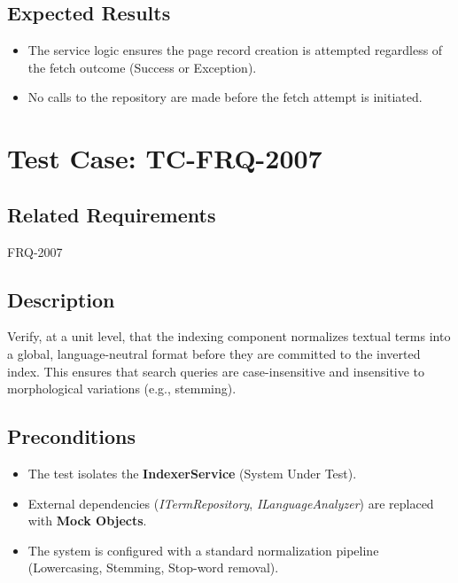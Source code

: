 \documentclass{article}
\begin{document}
\subsection*{Expected Results}
\begin{itemize}
    \item The service logic ensures the page record creation is attempted regardless of the fetch outcome (Success or Exception).
    \item No calls to the repository are made before the fetch attempt is initiated.
\end{itemize}



\section{Test Case: TC-FRQ-2007}

\subsection*{Related Requirements}
FRQ-2007

\subsection*{Description}
Verify, at a unit level, that the indexing component normalizes textual terms into a global, language-neutral format before they are committed to the inverted index. This ensures that search queries are case-insensitive and insensitive to morphological variations (e.g., stemming).

\subsection*{Preconditions}
\begin{itemize}
  \item The test isolates the \textbf{IndexerService} (System Under Test).
  \item External dependencies (\textit{ITermRepository}, \textit{ILanguageAnalyzer}) are replaced with \textbf{Mock Objects}.
  \item The system is configured with a standard normalization pipeline (Lowercasing, Stemming, Stop-word removal).
\end{itemize}
\end{document}
